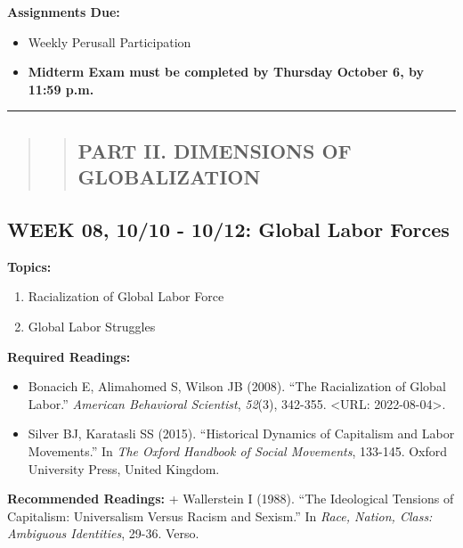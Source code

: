 \documentclass[11pt,]{article}
\providecommand{\tightlist}{%
  \setlength{\itemsep}{0pt}\setlength{\parskip}{0pt}}
\begin{document}
\textbf{Assignments Due:}

\begin{itemize}
\tightlist
\item
  Weekly Perusall Participation
\item
  \textbf{Midterm Exam must be completed by Thursday October 6, by 11:59
  p.m.}
\end{itemize}

\bigbreak
\hrule

\begin{quote}
\begin{quote}
\hypertarget{part-ii.-dimensions-of-globalization}{%
\subsection{PART II. DIMENSIONS OF
GLOBALIZATION}\label{part-ii.-dimensions-of-globalization}}
\end{quote}
\end{quote}

\hypertarget{week-08-1010---1012-global-labor-forces}{%
\subsection{WEEK 08, 10/10 - 10/12: Global Labor
Forces}\label{week-08-1010---1012-global-labor-forces}}

\textbf{Topics:}

\begin{enumerate}
\def\labelenumi{(\arabic{enumi})}
\tightlist
\item
  Racialization of Global Labor Force
\item
  Global Labor Struggles
\end{enumerate}

\textbf{Required Readings:}

\begin{itemize}
\item
  Bonacich E, Alimahomed S, Wilson JB (2008). ``The Racialization of
  Global Labor.'' \emph{American Behavioral Scientist}, \emph{52}(3),
  342-355. \textless URL: 2022-08-04\textgreater.
\item
  Silver BJ, Karatasli SS (2015). ``Historical Dynamics of Capitalism
  and Labor Movements.'' In \emph{The Oxford Handbook of Social
  Movements}, 133-145. Oxford University Press, United Kingdom.
\end{itemize}

\textbf{Recommended Readings:} + Wallerstein I (1988). ``The Ideological
Tensions of Capitalism: Universalism Versus Racism and Sexism.'' In
\emph{Race, Nation, Class: Ambiguous Identities}, 29-36. Verso.
\end{document}
